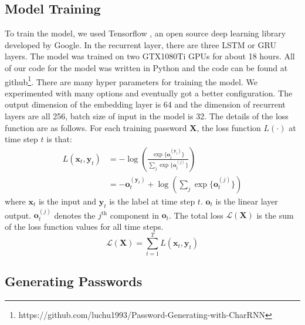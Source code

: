 \documentclass[10pt, twocolumnjournal]{IEEEtran}
\begin{document}
\subsection{Model Training}
To train the model, we used Tensorflow\cite{abadi2016tensorflow} , an open source deep learning library developed by Google. In the recurrent layer, there are three LSTM or GRU layers. The model was trained on two GTX1080Ti GPUs for about 18 hours. All of our code for the model was written in Python and the code can be found at github\footnote{https://github.com/luchu1993/Password-Generating-with-CharRNN}. There are many hyper parameters for training the model. We experimented with many options and eventually got a better configuration. The output dimension of the embedding layer is 64 and the dimension of recurrent layers are all 256, batch size of input in the model is 32. The details of the loss function are as follows. For each training password $\bm X$, the loss function $L(\cdot)$ at time step $t$ is that:
\begin{equation*}
	\begin{aligned}
		L(\bm x_t, \bm y_t) &= -\log \left(\frac{\exp\{ \bm o_t^{(\bm y_t)} \}}{\sum_{j}\exp\{\bm o_t^{(j)}\}}\right) \\ 
		&= -\bm o_t^{(\bm y_t)} + \log\left(\sum_{j}\exp\{\bm o_t^{(j)}\} \right)
	\end{aligned}
\end{equation*}
where $\bm x_t$ is the input and $\bm y_t$ is the label at time step $t$. $\bm o_t$ is the linear layer output. $\bm o_t^{(j)}$ denotes the $j^{\mathrm{th}}$ component in $\bm o_t$. The total loss $\mathcal L(\bm X)$ is the sum of the loss function values for all time steps.
\begin{equation*}
	\mathcal L(\bm X) = \sum_{t=1}^{T}L(\bm x_t, \bm y_t)
\end{equation*}


\subsection{Generating Passwords}
%
\end{document}
